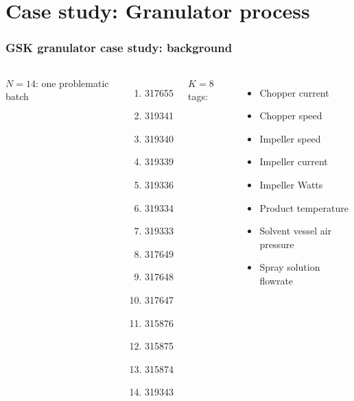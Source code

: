 \section{Case study: Granulator process}

\begin{frame}\frametitle{GSK granulator case study: background}
	
	\begin{columns}[t]
			\( N = 14 \): one problematic batch
			{\scriptsize
			\begin{enumerate}
				\item 		  317655
				\item		  319341
				\item		  319340
				\item		  319339
				\item		  319336
				\item		  319334
				\item		  319333
				\item		  317649
				\item		  317648
				\item		  317647
				\item		  315876
				\item		  315875
				\item		  315874
				\item		  319343
			\end{enumerate}
			}
			
				\( K = 8 \) tags:
				\begin{itemize}
					\item	Chopper current
					\item	Chopper speed
					\item	Impeller speed
					\item	Impeller current
					\item	Impeller Watts
					\item	Product temperature
					\item	Solvent vessel air pressure
					\item	Spray solution flowrate
				\end{itemize}
	\end{columns}
\end{frame}

